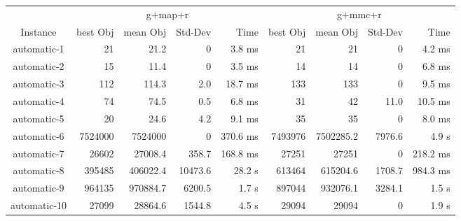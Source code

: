\documentclass[11pt]{article}
\begin{document}
{\begin{tabular}{c|rrrr|rrrr}
	     & \multicolumn{4}{c}{g+map+r} & \multicolumn{4}{c}{g+mmc+r} \\
Instance     & best Obj & mean Obj & Std-Dev & Time  &  best Obj & mean Obj & Std-Dev & Time          \\
\hline
automatic-1  & 21       & 21.2     & 0       & 3.8 ms  &  21       &  21      & 0       & 4.2 ms                \\
automatic-2  & 15       & 11.4     & 0       & 3.5 ms     &  14       &  14      & 0       & 6.8 ms               \\
automatic-3  & 112      & 114.3    & 2.0     & 18.7 ms   &  133      &  133     & 0       & 9.5 ms             \\
automatic-4  & 74       & 74.5     & 0.5     & 6.8 ms   &  31       &  42      & 11.0    & 10.5 ms                \\
automatic-5  & 20       & 24.6     & 4.2     & 9.1 ms   &  35       &  35      & 0       & 8.0 ms              \\
automatic-6  & 7524000  & 7524000  & 0       & 370.6 ms   &  7493976  &  7502285.2& 7976.6 & 4.9 s                 \\
automatic-7  & 26602    & 27008.4  & 358.7   & 168.8 ms  &  27251    &  27251   & 0       & 218.2 ms            \\
automatic-8  & 395485   & 406022.4 & 10473.6 & 28.2 s   &  613464   &  615204.6& 1708.7  & 984.3 ms          \\
automatic-9  & 964135   & 970884.7 & 6200.5  & 1.7 s   &  897044   &  932076.1& 3284.1  & 1.5 s                \\
automatic-10 & 27099    & 28864.6  & 1544.8  & 4.5 s   &  29094    &  29094   & 0       & 1.9 s                \\
\end{tabular}
}
\end{document}
